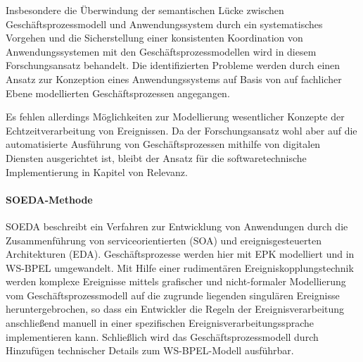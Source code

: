 Insbesondere die Überwindung der semantischen Lücke zwischen Geschäftsprozessmodell und Anwendungssystem durch ein systematisches Vorgehen und die Sicherstellung einer konsistenten Koordination von Anwendungssystemen mit den Geschäftsprozessmodellen wird in diesem Forschungsansatz behandelt. Die identifizierten Probleme werden durch einen Ansatz zur Konzeption eines Anwendungssystems auf Basis von auf fachlicher Ebene modellierten Geschäftsprozessen angegangen. 

Es fehlen allerdings Möglichkeiten zur Modellierung wesentlicher Konzepte der Echtzeitverarbeitung von Ereignissen.
Da der Forschungsansatz wohl aber auf die automatisierte Ausführung von Geschäftsprozessen mithilfe von digitalen Diensten ausgerichtet ist, bleibt der Ansatz für die softwaretechnische Implementierung in Kapitel von Relevanz. 

\paragraph{SOEDA-Methode}
SOEDA beschreibt ein Verfahren zur Entwicklung von Anwendungen durch die Zusammenführung von serviceorientierten (SOA) und ereignisgesteuerten Architekturen (EDA). Geschäftsprozesse werden hier mit EPK modelliert und in WS-BPEL umgewandelt. Mit Hilfe einer rudimentären Ereigniskopplungstechnik werden komplexe Ereignisse mittels grafischer und nicht-formaler Modellierung vom Geschäftsprozessmodell auf die zugrunde liegenden singulären Ereignisse heruntergebrochen, so dass ein Entwickler die Regeln der Ereignisverarbeitung anschließend manuell in einer spezifischen Ereignisverarbeitungssprache implementieren kann. Schließlich wird das Geschäftsprozessmodell durch Hinzufügen technischer Details zum WS-BPEL-Modell ausführbar.

